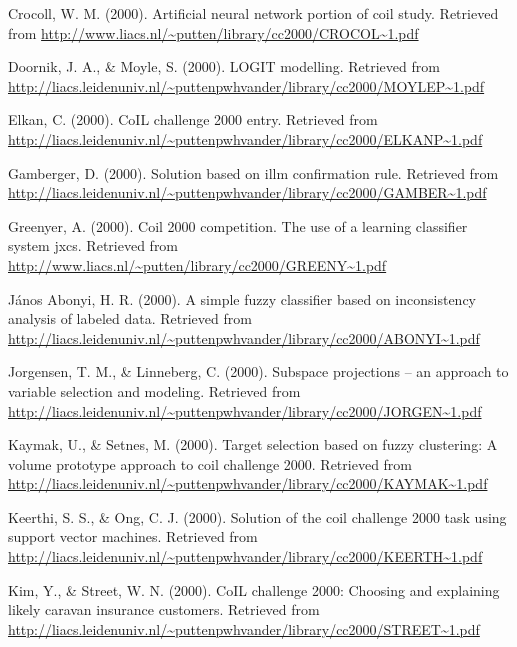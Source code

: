 \documentclass[man]{apa6}
\begin{document}
\leavevmode\hypertarget{ref-Crocoll}{}%
Crocoll, W. M. (2000). Artificial neural network portion of coil study. Retrieved from \url{http://www.liacs.nl/~putten/library/cc2000/CROCOL~1.pdf}

\leavevmode\hypertarget{ref-Doornik}{}%
Doornik, J. A., \& Moyle, S. (2000). LOGIT modelling. Retrieved from \url{http://liacs.leidenuniv.nl/~puttenpwhvander/library/cc2000/MOYLEP~1.pdf}

\leavevmode\hypertarget{ref-Elkan}{}%
Elkan, C. (2000). CoIL challenge 2000 entry. Retrieved from \url{http://liacs.leidenuniv.nl/~puttenpwhvander/library/cc2000/ELKANP~1.pdf}

\leavevmode\hypertarget{ref-Gamberger}{}%
Gamberger, D. (2000). Solution based on illm confirmation rule. Retrieved from \url{http://liacs.leidenuniv.nl/~puttenpwhvander/library/cc2000/GAMBER~1.pdf}

\leavevmode\hypertarget{ref-Greenyer}{}%
Greenyer, A. (2000). Coil 2000 competition. The use of a learning classifier system jxcs. Retrieved from \url{http://www.liacs.nl/~putten/library/cc2000/GREENY~1.pdf}

\leavevmode\hypertarget{ref-Abonyi}{}%
János Abonyi, H. R. (2000). A simple fuzzy classifier based on inconsistency analysis of labeled data. Retrieved from \url{http://liacs.leidenuniv.nl/~puttenpwhvander/library/cc2000/ABONYI~1.pdf}

\leavevmode\hypertarget{ref-Jorgensen}{}%
Jorgensen, T. M., \& Linneberg, C. (2000). Subspace projections -- an approach to variable selection and modeling. Retrieved from \url{http://liacs.leidenuniv.nl/~puttenpwhvander/library/cc2000/JORGEN~1.pdf}

\leavevmode\hypertarget{ref-Kaymak}{}%
Kaymak, U., \& Setnes, M. (2000). Target selection based on fuzzy clustering: A volume prototype approach to coil challenge 2000. Retrieved from \url{http://liacs.leidenuniv.nl/~puttenpwhvander/library/cc2000/KAYMAK~1.pdf}

\leavevmode\hypertarget{ref-Keerthi}{}%
Keerthi, S. S., \& Ong, C. J. (2000). Solution of the coil challenge 2000 task using support vector machines. Retrieved from \url{http://liacs.leidenuniv.nl/~puttenpwhvander/library/cc2000/KEERTH~1.pdf}

\leavevmode\hypertarget{ref-Kim}{}%
Kim, Y., \& Street, W. N. (2000). CoIL challenge 2000: Choosing and explaining likely caravan insurance customers. Retrieved from \url{http://liacs.leidenuniv.nl/~puttenpwhvander/library/cc2000/STREET~1.pdf}
\end{document}
